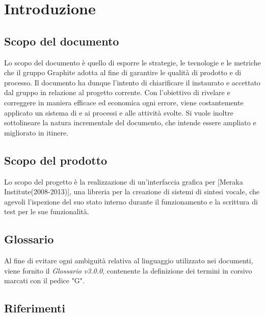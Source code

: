 \documentclass[openany,12pt,a4paper]{report}
\begin{document}
\tableofcontents


\chapter{Introduzione}

    \section{Scopo del documento}
    
    Lo scopo del documento è quello di esporre le strategie, le tecnologie e le metriche che il gruppo Graphite adotta al fine di garantire le qualità di prodotto e di processo. Il documento ha dunque l'intento di chiarificare il  instaurato e accettato dal gruppo in relazione al progetto corrente. Con l'obiettivo di rivelare e correggere in maniera efficace ed economica ogni errore, viene costantemente applicato un sistema di  e  ai processi e alle attività svolte. Si vuole inoltre sottolineare la natura incrementale del documento, che intende essere ampliato e migliorato in itinere.
    
    \section{Scopo del prodotto}
    
    Lo scopo del progetto è la realizzazione di un’interfaccia grafica per  [Meraka Institute(2008-2013)], una libreria per la creazione di sistemi di sintesi vocale, che agevoli l’ispezione del suo stato interno durante il funzionamento e la scrittura di test per le sue funzionalità.
    
    \section{Glossario}
    
    Al fine di evitare ogni ambiguità relativa al linguaggio utilizzato nei documenti, viene fornito il \textit{Glossario v3.0.0}, contenente la definizione dei termini in corsivo marcati con il pedice "G".
    
    \section{Riferimenti}
    
\end{document}
